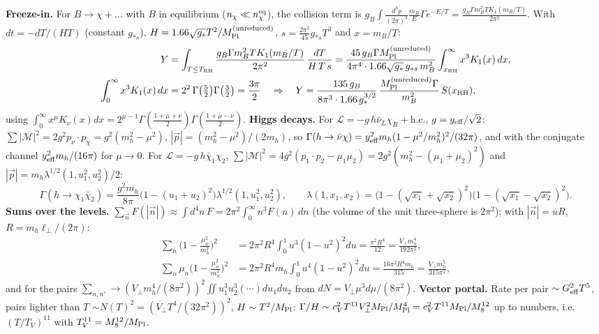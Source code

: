 \documentclass[10pt,a4paper]{article}
\begin{document}
\textbf{Freeze-in.} For $B\to\chi+\dots$ with $B$ in equilibrium ($n_\chi\ll n_\chi^{\rm eq}$), the collision term is $g_B\int\frac{d^3p}{(2\pi)^3}\frac{m_B}{E}\Gamma e^{-E/T}=\frac{g_B\Gamma m_B^2TK_1(m_B/T)}{2\pi^2}$. With $dt=-dT/(HT)$ (constant $g_{*s}$), $H=1.66\sqrt{g_*}T^2/M_{\rm Pl}^{\rm (unreduced)}$, $s=\frac{2\pi^2}{45}g_{*s}T^3$ and $x=m_B/T$:
\begin{align*}
Y&=\int_{T\le T_{\rm RH}}\frac{g_B\Gamma m_B^2TK_1(m_B/T)}{2\pi^2}\,\frac{dT}{H\,T\,s}=\frac{45\,g_B\Gamma M_{\rm Pl}^{\rm (unreduced)}}{4\pi^4\cdot1.66\sqrt{g_*}\,g_{*s}\,m_B^2}\int_{x_{\rm RH}}^\infty x^3K_1(x)\,dx, \\
\int_0^\infty x^3K_1(x)\,dx&=2^2\,\Gamma\big(\tfrac52\big)\Gamma\big(\tfrac32\big)=\frac{3\pi}2\quad\Rightarrow\quad Y=\frac{135\,g_B}{8\pi^3\cdot1.66\,g_*^{3/2}}\,\frac{M_{\rm Pl}^{\rm (unreduced)}\Gamma}{m_B^2}\,S(x_{\rm RH}),
\end{align*}
using $\int_0^\infty x^\mu K_\nu(x)dx=2^{\mu-1}\Gamma(\frac{1+\mu+\nu}2)\Gamma(\frac{1+\mu-\nu}2)$. \textbf{Higgs decays.} For $\mathcal L=-g\,h\bar\nu_L\chi_R+\text{h.c.}$, $g=y_{\rm eff}/\sqrt2$: $\sum|\mathcal M|^2=2g^2p_\nu\cdot p_\chi=g^2(m_h^2-\mu^2)$, $|\vec p|=(m_h^2-\mu^2)/(2m_h)$, so $\Gamma(h\to\bar\nu\chi)=y_{\rm eff}^2m_h(1-\mu^2/m_h^2)^2/(32\pi)$, and with the conjugate channel $y_{\rm eff}^2m_h/(16\pi)$ for $\mu\to0$. For $\mathcal L=-g\,h\bar\chi_1\chi_2$, $\sum|\mathcal M|^2=4g^2(p_1\cdot p_2-\mu_1\mu_2)=2g^2(m_h^2-(\mu_1+\mu_2)^2)$ and $|\vec p|=m_h\lambda^{1/2}(1,u_1^2,u_2^2)/2$:
\begin{equation*}
\Gamma(h\to\chi_1\bar\chi_2)=\frac{g^2m_h}{8\pi}\big(1-(u_1+u_2)^2\big)\lambda^{1/2}(1,u_1^2,u_2^2),\qquad \lambda(1,x_1,x_2)=\big(1-(\sqrt{x_1}+\sqrt{x_2})^2\big)\big(1-(\sqrt{x_1}-\sqrt{x_2})^2\big).
\end{equation*}
\textbf{Sums over the levels.} $\sum_{\vec n}F(|\vec n|)\approx\int d^4n\,F=2\pi^2\int_0^\infty n^3F(n)\,dn$ (the volume of the unit three-sphere is $2\pi^2$); with $|\vec n|=uR$, $R=m_h\ell_\perp/(2\pi)$:
\begin{align*}
\sum_n\Big(1-\frac{\mu_n^2}{m_h^2}\Big)^2&=2\pi^2R^4\int_0^1u^3(1-u^2)^2du=\frac{\pi^2R^4}{12}=\frac{V_\perp m_h^4}{192\pi^2}, \\
\sum_n\mu_n\Big(1-\frac{\mu_n^2}{m_h^2}\Big)^2&=2\pi^2R^4m_h\int_0^1u^4(1-u^2)^2du=\frac{16\pi^2R^4m_h}{315}=\frac{V_\perp m_h^5}{315\pi^2},
\end{align*}
and for the pairs $\sum_{n,n'}\to(V_\perp m_h^4/(8\pi^2))^2\iint u_1^3u_2^3(\cdots)du_1du_2$ from $dN=V_\perp\mu^3d\mu/(8\pi^2)$. \textbf{Vector portal.} Rate per pair $\sim G_{\rm eff}^2T^5$, pairs lighter than $T$ $\sim N(T)^2=(V_\perp T^4/(32\pi^2))^2$, $H\sim T^2/M_{\rm Pl}$: $\Gamma/H\sim c_V^2T^{11}V_\perp^2M_{\rm Pl}/M_{\rm Pl}^4=c_V^2T^{11}M_{\rm Pl}/M_8^{12}$ up to numbers, i.e. $(T/T_V)^{11}$ with $T_V^{11}=M_8^{12}/M_{\rm Pl}$.
\end{document}

